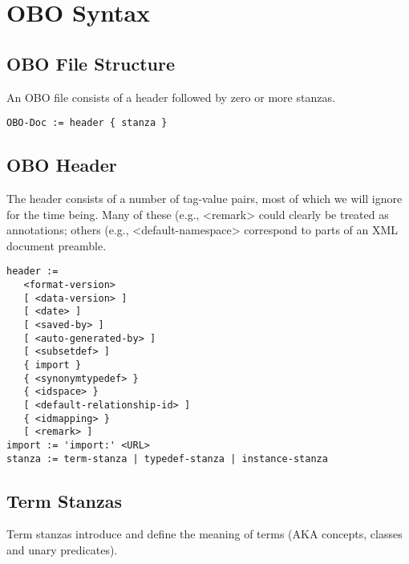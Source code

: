\section{OBO Syntax}

\subsection{OBO File Structure}

An OBO file consists of a header followed by zero or more stanzas.

\begin{verbatim}
OBO-Doc := header { stanza }
\end{verbatim}

\subsection{OBO Header}

The header consists of a number of tag-value pairs, most of which we will ignore for the time being. Many of these (e.g., <remark> could clearly be treated as annotations; others (e.g., <default-namespace> correspond to parts of an XML document preamble.

\begin{verbatim}
header :=
   <format-version>
   [ <data-version> ]
   [ <date> ]
   [ <saved-by> ]
   [ <auto-generated-by> ]
   [ <subsetdef> ]
   { import }
   { <synonymtypedef> }
   { <idspace> }
   [ <default-relationship-id> ]
   { <idmapping> }
   [ <remark> ]
import := 'import:' <URL>
stanza := term-stanza | typedef-stanza | instance-stanza
\end{verbatim}

\subsection{Term Stanzas}

Term stanzas introduce and define the meaning of terms (AKA concepts, classes and unary predicates).

